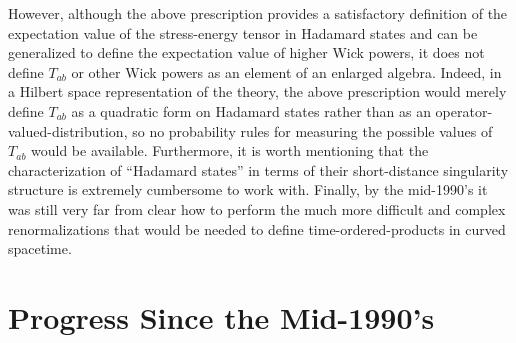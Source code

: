 \documentclass[12pt,epsf,amsfonts,amssymb]{article}
\begin{document}
However, although the above prescription provides a satisfactory
definition of the expectation value of the stress-energy tensor in
Hadamard states and can be generalized to define the expectation value
of higher Wick powers, it does not define $T_{ab}$ or other Wick
powers as an element of an enlarged algebra. Indeed, in a Hilbert
space representation of the theory, the above prescription would
merely define $T_{ab}$ as a quadratic form on Hadamard states rather
than as an operator-valued-distribution, so no probability rules for
measuring the possible values of $T_{ab}$ would be
available. Furthermore, it is worth mentioning that the
characterization of ``Hadamard states'' in terms of their
short-distance singularity structure is extremely cumbersome to work
with. Finally, by the mid-1990's it was still very far from clear how
to perform the much more difficult and complex renormalizations that
would be needed to define time-ordered-products in curved spacetime.


\section{Progress Since the Mid-1990's}
\end{document}
